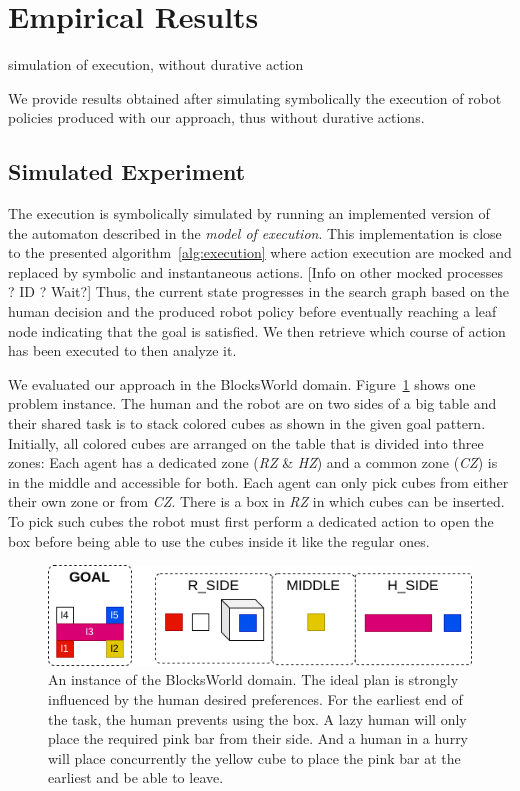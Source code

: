 \section{Empirical Results}
simulation of execution, without durative action

We provide results obtained after simulating symbolically the execution of robot policies produced with our approach, thus without durative actions. 

    \subsection{Simulated Experiment}

The execution is symbolically simulated by running an implemented version of the automaton described in the \textit{model of execution}. This implementation is close to the presented algorithm~\ref{alg:execution} where action execution are mocked and replaced by symbolic and instantaneous actions. [Info on other mocked processes ? ID ? Wait?]
Thus, the current state progresses in the search graph based on the human decision and the produced robot policy before eventually reaching a leaf node indicating that the goal is satisfied. 
We then retrieve which course of action has been executed to then analyze it.

We evaluated our approach in the BlocksWorld domain. Figure~\ref{fig:block_world_domain} shows one problem instance. 
The human and the robot are on two sides of a big table and their shared task is to stack colored cubes as shown in the given goal pattern. 
Initially, all colored cubes are arranged on the table that is divided into three zones: Each agent has a dedicated zone (\textit{RZ} \& \textit{HZ}) and a common zone (\textit{CZ}) is in the middle and accessible for both. 
Each agent can only pick cubes from either their own zone or from \textit{CZ}. 
There is a box in \textit{RZ} in which cubes can be inserted. To pick such cubes the robot must first perform a dedicated action to open the box before being able to use the cubes inside it like the regular ones.


\begin{figure}
    \centering
    \includegraphics[width=\linewidth]{images/Chapter4/block_world_domain.png}
    \caption{An instance of the BlocksWorld domain. The ideal plan is strongly influenced by the human desired  preferences. For the earliest end of the task, the human prevents using the box. A lazy human will only place the required pink bar from their side. And a human in a hurry will place concurrently the yellow cube to place the pink bar at the earliest and be able to leave.}
    \label{fig:block_world_domain}
\end{figure}


